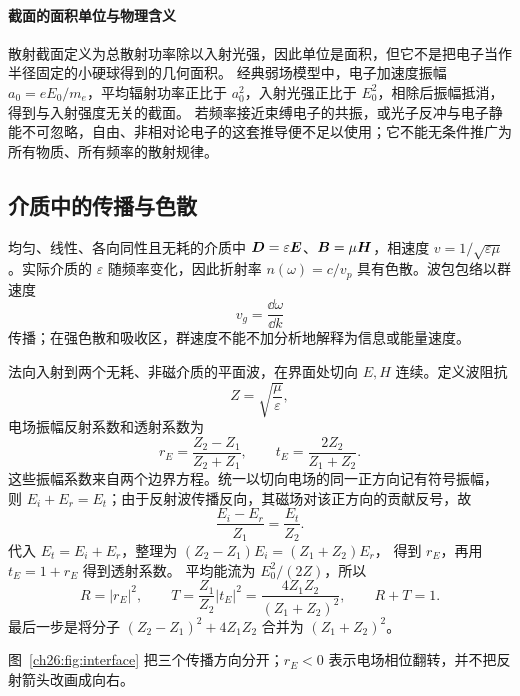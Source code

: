 {\thomsonScatteringDiagram


\paragraph{截面的面积单位与物理含义}
散射截面定义为总散射功率除以入射光强，因此单位是面积，但它不是把电子当作半径固定的小硬球得到的几何面积。
经典弱场模型中，电子加速度振幅 $a_0=eE_0/m_e$，平均辐射功率正比于 $a_0^2$，入射光强正比于 $E_0^2$，相除后振幅抵消，得到与入射强度无关的截面。
若频率接近束缚电子的共振，或光子反冲与电子静能不可忽略，自由、非相对论电子的这套推导便不足以使用；它不能无条件推广为所有物质、所有频率的散射规律。


\subsection{介质中的传播与色散}


均匀、线性、各向同性且无耗的介质中 $\bm{D}=\varepsilon\bm{E}$、$\bm{B}=\mu\bm{H}$，相速度
$v=1/\sqrt{\varepsilon\mu}$。实际介质的 $\varepsilon$ 随频率变化，因此折射率
$n(\omega)=c/v_p$ 具有色散。波包包络以群速度
\begin{equation}
 v_g=\frac{\dd\omega}{\dd k}
\end{equation}
传播；在强色散和吸收区，群速度不能不加分析地解释为信息或能量速度。

法向入射到两个无耗、非磁介质的平面波，在界面处切向 $E,H$ 连续。定义波阻抗
\begin{equation}
 Z=\sqrt{\frac{\mu}{\varepsilon}},
\end{equation}
电场振幅反射系数和透射系数为
\begin{equation}
 r_E=\frac{Z_2-Z_1}{Z_2+Z_1},
 \qquad
 t_E=\frac{2Z_2}{Z_1+Z_2}.
\end{equation}
这些振幅系数来自两个边界方程。统一以切向电场的同一正方向记有符号振幅，
则 $E_i+E_r=E_t$；由于反射波传播反向，其磁场对该正方向的贡献反号，故
\[
 \frac{E_i-E_r}{Z_1}=\frac{E_t}{Z_2}.
\]
代入 $E_t=E_i+E_r$，整理为 $(Z_2-Z_1)E_i=(Z_1+Z_2)E_r$，
得到 $r_E$，再用 $t_E=1+r_E$ 得到透射系数。
平均能流为 $E_0^2/(2Z)$，所以
\[
 R=|r_E|^2,\qquad T=\frac{Z_1}{Z_2}|t_E|^2
   =\frac{4Z_1Z_2}{(Z_1+Z_2)^2},\qquad R+T=1.
\]
最后一步是将分子 $(Z_2-Z_1)^2+4Z_1Z_2$ 合并为 $(Z_1+Z_2)^2$。

\begin{center}
\end{center}
图~\ref{ch26:fig:interface} 把三个传播方向分开；$r_E<0$ 表示电场相位翻转，并不把反射箭头改画成向右。


}
